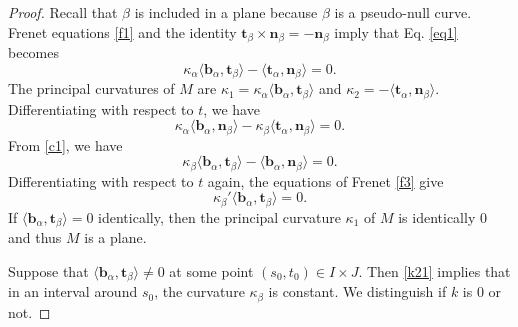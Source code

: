 \documentclass[10pt,a4paper]{amsart}
\def\b{\mathbf b}
\def\n{\mathbf n}
\def\t{\mathbf t}
\begin{document}
\begin{proof}
Recall that $\beta$ is included in a plane because $\beta$ is a pseudo-null curve. Frenet equations \eqref{f1} and the identity  $\t_\beta\times\n_\beta=-\n_\beta$ imply that Eq. \eqref{eq1} becomes
\begin{equation}\label{c1}\kappa_\alpha\langle \b_\alpha,\t_\beta\rangle-\langle\t_\alpha,\n_\beta\rangle=0.
\end{equation}
The principal curvatures of $M$ are $\kappa_1=\kappa_\alpha\langle \b_\alpha,\t_\beta\rangle$ and $\kappa_2=-\langle\t_\alpha,\n_\beta\rangle$. Differentiating with respect to  $t$, we have
$$\kappa_\alpha\langle\b_\alpha,\n_\beta\rangle-\kappa_\beta\langle\t_\alpha,\n_\beta\rangle=0.$$
From   \eqref{c1}, we have 
\begin{equation}\label{c11}
\kappa_\beta\langle\b_\alpha,\t_\beta\rangle-\langle\b_\alpha,\n_\beta\rangle=0.
\end{equation}
Differentiating with respect to $t$ again, the equations of Frenet \eqref{f3} give
\begin{equation}\label{k21}\kappa_\beta'\langle\b_\alpha,\t_\beta\rangle=0.
\end{equation}
If $\langle\b_\alpha,\t_\beta\rangle=0$ identically, then the principal curvature $\kappa_1$ of $M$ is identically $0$ and   thus $M$ is a plane. 

Suppose that  $\langle\b_\alpha,\t_\beta\rangle\not=0$ at some point $(s_0,t_0)\in I\times J$. Then \eqref{k21} implies that  in an interval around $s_0$, the curvature $\kappa_\beta$ is constant.   We distinguish if $k$ is $0$ or not.
 

\end{proof}
\end{document}
